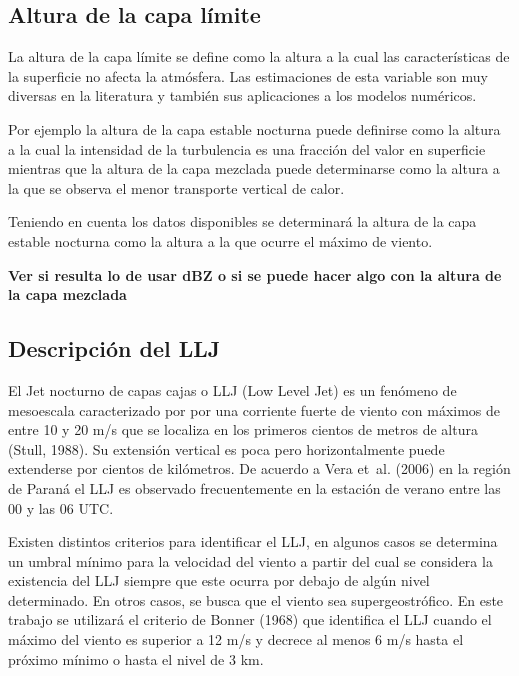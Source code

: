 \documentclass[12pt,spanish,oneside]{book}
\begin{document}
\subsection{\texorpdfstring{Altura de la capa límite
\label{sec-pbh}}{Altura de la capa límite }}\label{altura-de-la-capa-limite}

La altura de la capa límite se define como la altura a la cual las
características de la superficie no afecta la atmósfera. Las
estimaciones de esta variable son muy diversas en la literatura y
también sus aplicaciones a los modelos numéricos.

Por ejemplo la altura de la capa estable nocturna puede definirse como
la altura a la cual la intensidad de la turbulencia es una fracción del
valor en superficie mientras que la altura de la capa mezclada puede
determinarse como la altura a la que se observa el menor transporte
vertical de calor.

Teniendo en cuenta los datos disponibles se determinará la altura de la
capa estable nocturna como la altura a la que ocurre el máximo de
viento.

\textbf{Ver si resulta lo de usar dBZ o si se puede hacer algo con la
altura de la capa mezclada}

\subsection{Descripción del LLJ}\label{descripcion-del-llj}

El Jet nocturno de capas cajas o LLJ (Low Level Jet) es un fenómeno de
mesoescala caracterizado por por una corriente fuerte de viento con
máximos de entre 10 y 20 m/s que se localiza en los primeros cientos de
metros de altura (Stull, 1988). Su extensión vertical es poca pero
horizontalmente puede extenderse por cientos de kilómetros. De acuerdo a
Vera et~al. (2006) en la región de Paraná el LLJ es observado
frecuentemente en la estación de verano entre las 00 y las 06 UTC.

Existen distintos criterios para identificar el LLJ, en algunos casos se
determina un umbral mínimo para la velocidad del viento a partir del
cual se considera la existencia del LLJ siempre que este ocurra por
debajo de algún nivel determinado. En otros casos, se busca que el
viento sea supergeostrófico. En este trabajo se utilizará el criterio de
Bonner (1968) que identifica el LLJ cuando el máximo del viento es
superior a 12 m/s y decrece al menos 6 m/s hasta el próximo mínimo o
hasta el nivel de 3 km.
\end{document}
